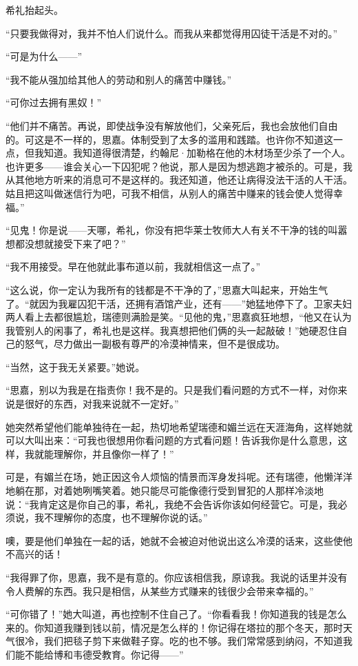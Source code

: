 \par 希礼抬起头。
\par “只要我做得对，我并不怕人们说什么。而我从来都觉得用囚徒干活是不对的。”
\par “可是为什么——”
\par “我不能从强加给其他人的劳动和别人的痛苦中赚钱。”
\par “可你过去拥有黑奴！”
\par “他们并不痛苦。再说，即使战争没有解放他们，父亲死后，我也会放他们自由的。可这是不一样的，思嘉。体制受到了太多的滥用和践踏。也许你不知道这一点，但我知道。我知道得很清楚，约翰尼·加勒格在他的木材场至少杀了一个人。也许更多——谁会关心一下囚犯呢？他说，那人是因为想逃跑才被杀的。可是，我从其他地方听来的消息可不是这样的。我还知道，他还让病得没法干活的人干活。姑且把这叫做迷信行为吧，可我不相信，从别人的痛苦中赚来的钱会使人觉得幸福。”
\par “见鬼！你是说——天哪，希礼，你没有把华莱士牧师大人有关不干净的钱的叫嚣想都没想就接受下来了吧？”
\par “我不用接受。早在他就此事布道以前，我就相信这一点了。”
\par “这么说，你一定认为我所有的钱都是不干净的了，”思嘉大叫起来，开始生气了。“就因为我雇囚犯干活，还拥有酒馆产业，还有——”她猛地停下了。卫家夫妇两人看上去都很尴尬，瑞德则满脸是笑。“见他的鬼，”思嘉疯狂地想，“他又在认为我管别人的闲事了，希礼也是这样。我真想把他们俩的头一起敲破！”她硬忍住自己的怒气，尽力做出一副极有尊严的冷漠神情来，但不是很成功。
\par “当然，这于我无关紧要。”她说。
\par “思嘉，别以为我是在指责你！我不是的。只是我们看问题的方式不一样，对你来说是很好的东西，对我来说就不一定好。”
\par 她突然希望他们能单独待在一起，热切地希望瑞德和媚兰远在天涯海角，这样她就可以大叫出来：“可我也很想用你看问题的方式看问题！告诉我你是什么意思，这样，我就能理解你，并且像你一样了！”
\par 可是，有媚兰在场，她正因这令人烦恼的情景而浑身发抖呢。还有瑞德，他懒洋洋地躺在那，对着她咧嘴笑着。她只能尽可能像德行受到冒犯的人那样冷淡地说：“我肯定这是你自己的事，希礼，我绝不会告诉你该如何经营它。可是，我必须说，我不理解你的态度，也不理解你说的话。”
\par 噢，要是他们单独在一起的话，她就不会被迫对他说出这么冷漠的话来，这些使他不高兴的话！
\par “我得罪了你，思嘉，我不是有意的。你应该相信我，原谅我。我说的话里并没有令人费解的东西。我只是相信，从某些方式赚来的钱很少会带来幸福的。”
\par “可你错了！”她大叫道，再也控制不住自己了。“你看看我！你知道我的钱是怎么来的。你知道我赚到钱以前，情况是怎么样的！你记得在塔拉的那个冬天，那时天气很冷，我们把毯子剪下来做鞋子穿。吃的也不够。我们常常感到纳闷，不知道我们能不能给博和韦德受教育。你记得——”
